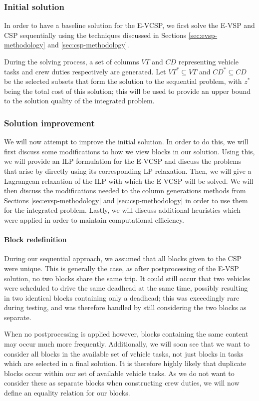 \documentclass[]{article}
\begin{document}
\subsubsection{Initial solution}
In order to have a baseline solution for the E-VCSP, we first solve the E-VSP and CSP sequentially using the techniques discussed in Sections \ref{sec:evsp-methodology} and \ref{sec:csp-methodology}. 

During the solving process, a set of columns $VT$ and $CD$ representing vehicle tasks and crew duties respectively are generated. Let $VT^* \subseteq VT$ and $CD^* \subseteq CD$ be the selected subsets that form the solution to the sequential problem, with $z^*$ being the total cost of this solution; this will be used to provide an upper bound to the solution quality of the integrated problem. 

\subsubsection{Solution improvement}
We will now attempt to improve the initial solution. In order to do this, we will first discuss some modifications to how we view blocks in our solution. Using this, we will provide an ILP formulation for the E-VCSP and discuss the problems that arise by directly using its corresponding LP relaxation. Then, we will give a Lagrangean relaxation of the ILP with which the E-VCSP will be solved. We will then discuss the modifications needed to the column generations methods from Sections \ref{sec:evsp-methodology} and \ref{sec:csp-methodology} in order to use them for the integrated problem. Lastly, we will discuss additional heuristics which were applied in order to maintain computational efficiency. 

\paragraph{Block redefinition} During our sequential approach, we assumed that all blocks given to the CSP were unique. This is generally the case, as after postprocessing of the E-VSP solution, no two blocks share the same trip. It could still occur that two vehicles were scheduled to drive the same deadhead at the same time, possibly resulting in two identical blocks containing only a deadhead; this was exceedingly rare during testing, and was therefore handled by still considering the two blocks as separate.

When no postprocessing is applied however, blocks containing the same content may occur much more frequently. Additionally, we will soon see that we want to consider all blocks in the available set of vehicle tasks, not just blocks in tasks which are selected in a final solution. It is therefore highly likely that duplicate blocks occur within our set of available vehicle tasks. As we do not want to consider these as separate blocks when constructing crew duties, we will now define an equality relation for our blocks. 
\end{document}
